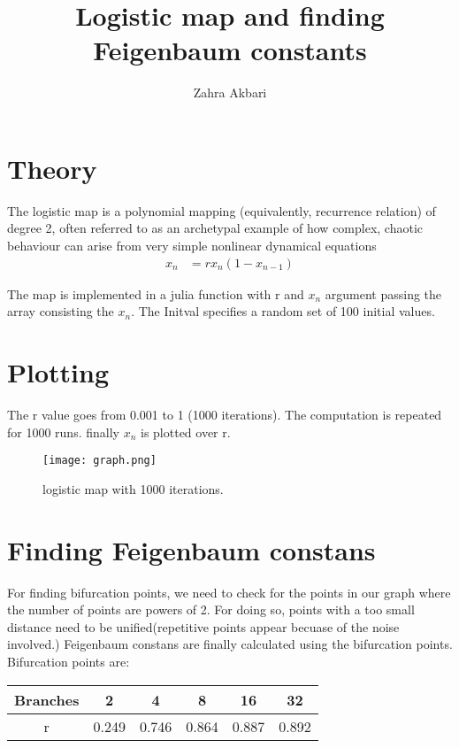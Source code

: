 \documentclass[12pt,a4paper]{article}
\title{Logistic map and finding Feigenbaum constants}
\author{Zahra Akbari}
\date{}
\begin{document}
	\maketitle
	\section*{Theory }
	The logistic map is a polynomial mapping (equivalently, recurrence relation) of degree 2, often referred to as an archetypal example of how complex, chaotic behaviour can arise from very simple nonlinear dynamical equations
	\begin{align*}
	x_n &= r x_n (1-x_{n-1}) 
	\end{align*}


	The map is implemented in a julia function with r and $x_n$ argument passing the array consisting the $x_n$. The Initval specifies a random set of 100 initial values.


	


	\section*{Plotting}
	The r value goes from 0.001 to 1 (1000 iterations). The computation is repeated for 1000 runs. finally $x_n$ is plotted over r.

			
			\begin{figure}[H]
				\centering
				\texttt{[image: graph.png]}
				\caption{logistic map with 1000 iterations. }
			\end{figure}

			

	\section{Finding Feigenbaum constans}		
			For finding bifurcation points, we need to check for the points in our graph where the number of points are powers of 2. For doing so, points with a too small distance need to be unified(repetitive points appear becuase of the noise involved.)
			Feigenbaum constans are finally calculated using the bifurcation points.
			Bifurcation points are:\\
			\begin{center}
				
				\begin{tabular}{|c|c|c|c|c|c|}
				\hline
				Branches &2&4&8&16&32 \\
				\hline
				r &0.249& 0.746& 0.864& 0.887& 0.892 \\
				\hline
	
				\end{tabular}

			\end{center}
			
\end{document}
